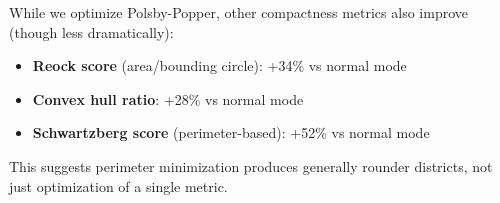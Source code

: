 While we optimize Polsby-Popper, other compactness metrics also improve (though less dramatically):
\begin{itemize}
    \item \textbf{Reock score} (area/bounding circle): +34\% vs normal mode
    \item \textbf{Convex hull ratio}: +28\% vs normal mode
    \item \textbf{Schwartzberg score} (perimeter-based): +52\% vs normal mode
\end{itemize}

This suggests perimeter minimization produces generally rounder districts, not just optimization of a single metric.
